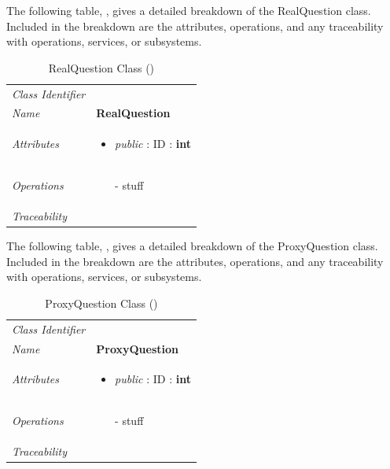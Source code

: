 \documentclass[12pt,letterpaper]{article}
\begin{document}
The following table, , gives a detailed breakdown of the RealQuestion class. Included in the breakdown are the attributes, operations, and any traceability with operations, services, or subsystems.

\begin{table}[H]
    \caption{RealQuestion Class ()} 
	\begin{tabu} to 
		\toprule
		Class Identifier &  \\
		Name & {\bf RealQuestion} \\
		Attributes & 
		\begin{minipage}[t]{\linewidth}
		    \begin{itemize}
		        \item \textit{public} : ID : \bf{int}
			\end{itemize}
	    \end{minipage} \\

		Operations &
		\begin{minipage}[t]{\linewidth}
			\begin{enumerate}
			    \item[-] stuff
	        \end{enumerate}
	    \end{minipage} \\
	    	Traceability & \\
		\toprule
	\end{tabu}
\end{table}

The following table, , gives a detailed breakdown of the ProxyQuestion class. Included in the breakdown are the attributes, operations, and any traceability with operations, services, or subsystems.

\begin{table}[H]
    \caption{ProxyQuestion Class ()} 
	\begin{tabu} to 
		\toprule
		Class Identifier &  \\
		Name & {\bf ProxyQuestion} \\
		Attributes & 
		\begin{minipage}[t]{\linewidth}
		    \begin{itemize}
		        \item \textit{public} : ID : \bf{int}
			\end{itemize}
	    \end{minipage} \\

		Operations &
		\begin{minipage}[t]{\linewidth}
			\begin{enumerate}
			    \item[-] stuff
	        \end{enumerate}
	    \end{minipage} \\
	    	Traceability & \\
		\toprule
	\end{tabu}
\end{table}
\end{document}
